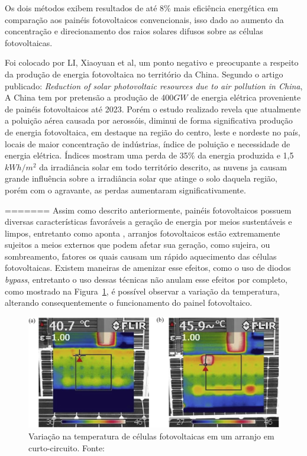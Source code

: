 Os dois métodos exibem resultados de até 8\% mais eficiência energética em comparação aos painéis fotovoltaicos convencionais, isso dado ao aumento da concentração e direcionamento dos raios solares difusos sobre as células fotovoltaicas.

Foi colocado por LI, Xiaoyuan et al, um ponto negativo e preocupante a respeito da produção de energia fotovoltaica no território da China. Segundo o artigo publicado: \textit{Reduction of solar photovoltaic resources due to air pollution in China}, A China tem por pretensão a produção de 400$GW$ de energia elétrica proveniente de painéis fotovoltaicos até 2023. Porém o estudo realizado revela que atualmente a poluição aérea causada por aerossóis, diminui de forma significativa produção de energia fotovoltaica, em destaque na região do centro, leste e nordeste no país, locais de maior concentração de indústrias, índice de poluição e necessidade de energia elétrica. Índices mostram uma perda de 35\% da energia produzida e 1,5$kWh/m^2$ da irradiância solar em todo território descrito, as nuvens ja causam grande influência sobre a irradiância solar que atinge o solo daquela região, porém com o agravante, as perdas aumentaram significativamente.


=======
Assim como descrito anteriormente, painéis fotovoltaicos possuem diversas características favoráveis a geração de energia por meios sustentáveis e limpos, entretanto como aponta , arranjos fotovoltaicos estão extremamente sujeitos a meios externos que podem afetar sua geração, como sujeira, ou sombreamento, fatores os quais causam um rápido aquecimento das células fotovoltaicas. Existem maneiras de amenizar esse efeitos, como o uso de diodos \textit{bypass}, entretanto o uso dessas técnicas não anulam esse efeitos por completo, como mostrado na Figura~\ref{fig:Temp}, é possível observar a variação da temperatura, alterando consequentemente o funcionamento do painel fotovoltaico.

\FloatBarrier
\begin{figure}[htbp]
	\centering
	\includegraphics[scale=1.3]{imagens/Temp_BRESSAN}
	\caption{Variação na temperatura de células fotovoltaicas em um arranjo em curto-circuito. Fonte:   }
	
	\label{fig:Temp}
\end{figure}
\FloatBarrier

